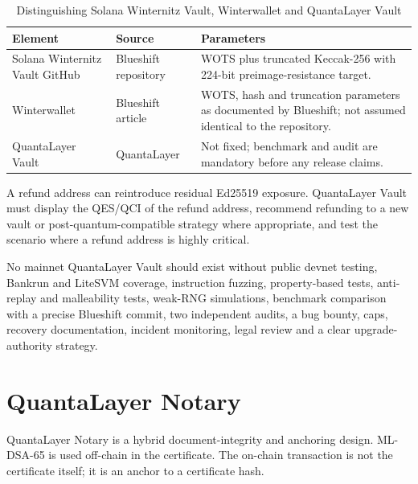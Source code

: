 \documentclass[11pt,a4paper,oneside,parskip=false]{scrartcl}
\newcommand{\QES}{\textsc{QES}}
\newcommand{\QCI}{\textsc{QCI}}
\begin{document}
\begin{table}[htbp]
\centering
\caption{Distinguishing Solana Winternitz Vault, Winterwallet and QuantaLayer Vault}
\label{tab:vault-parameters}
\small
\begin{tabularx}{\textwidth}{L{0.30\textwidth}L{0.20\textwidth}Y}
\toprule
\textbf{Element} & \textbf{Source} & \textbf{Parameters} \\
\midrule
Solana Winternitz Vault GitHub & Blueshift repository & WOTS plus truncated Keccak-256 with 224-bit preimage-resistance target. \\
Winterwallet & Blueshift article & WOTS, hash and truncation parameters as documented by Blueshift; not assumed identical to the repository. \\
QuantaLayer Vault & QuantaLayer & Not fixed; benchmark and audit are mandatory before any release claims. \\
\bottomrule
\end{tabularx}
\end{table}

A refund address can reintroduce residual Ed25519 exposure. QuantaLayer Vault must display the \QES{}/\QCI{} of the refund address, recommend refunding to a new vault or post-quantum-compatible strategy where appropriate, and test the scenario where a refund address is highly critical.

No mainnet QuantaLayer Vault should exist without public devnet testing, Bankrun and LiteSVM coverage, instruction fuzzing, property-based tests, anti-replay and malleability tests, weak-RNG simulations, benchmark comparison with a precise Blueshift commit, two independent audits, a bug bounty, caps, recovery documentation, incident monitoring, legal review and a clear upgrade-authority strategy.

\section{QuantaLayer Notary}

QuantaLayer Notary is a hybrid document-integrity and anchoring design. ML-DSA-65 is used off-chain in the certificate. The on-chain transaction is not the certificate itself; it is an anchor to a certificate hash.
\end{document}
